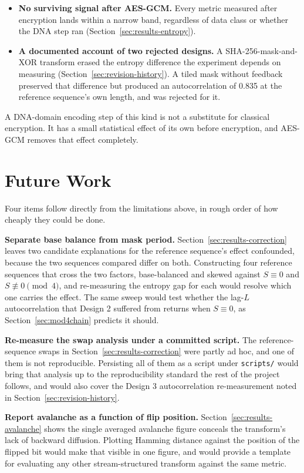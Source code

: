 \documentclass[12pt,a4paper,twoside]{report}
\numberwithin{equation}{chapter}
\begin{document}
\begin{itemize}
\item \textbf{No surviving signal after AES-GCM.} Every metric
measured after encryption lands within a narrow band, regardless of
data class or whether the DNA step ran
(Section~\ref{sec:results-entropy}).

\item \textbf{A documented account of two rejected designs.} A
SHA-256-mask-and-XOR transform erased the entropy difference the
experiment depends on measuring
(Section~\ref{sec:revision-history}). A tiled mask without feedback
preserved that difference but produced an autocorrelation of 0.835 at
the reference sequence's own length, and was rejected for it.

\end{itemize}

A DNA-domain encoding step of this kind is not a substitute for
classical encryption. It has a small statistical effect of its own
before encryption, and AES-GCM removes that effect completely.

\section{Future Work}
\label{sec:future-work}
Four items follow directly from the limitations above, in rough order
of how cheaply they could be done.

\textbf{Separate base balance from mask period.}
Section~\ref{sec:results-correction} leaves two candidate explanations
for the reference sequence's effect confounded, because the two
sequences compared differ on both. Constructing four reference
sequences that cross the two factors, base-balanced and skewed against
$S \equiv 0$ and $S \not\equiv 0 \pmod 4$, and re-measuring the
entropy gap for each would resolve which one carries the effect. The
same sweep would test whether the lag-$L$ autocorrelation that
Design 2 suffered from returns when $S \equiv 0$, as
Section~\ref{sec:mod4chain} predicts it should.

\textbf{Re-measure the swap analysis under a committed script.} The
reference-sequence swaps in Section~\ref{sec:results-correction} were
partly ad hoc, and one of them is not reproducible. Persisting all of
them as a script under \texttt{scripts/} would bring that analysis up
to the reproducibility standard the rest of the project follows, and
would also cover the Design 3 autocorrelation re-measurement noted in
Section~\ref{sec:revision-history}.

\textbf{Report avalanche as a function of flip position.}
Section~\ref{sec:results-avalanche} shows the single averaged avalanche
figure conceals the transform's lack of backward diffusion. Plotting
Hamming distance against the position of the flipped bit would make
that visible in one figure, and would provide a template for evaluating
any other stream-structured transform against the same metric.
\end{document}
